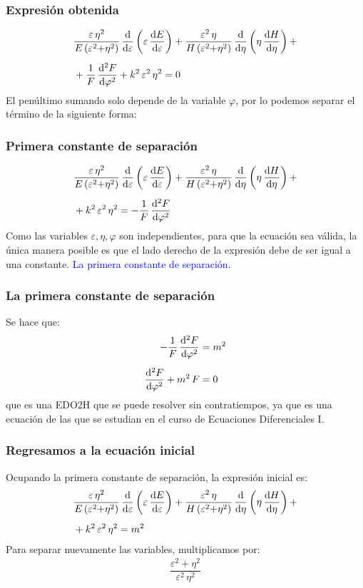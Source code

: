 \documentclass[12pt]{beamer}
\begin{document}
\begin{frame}
\frametitle{Expresión obtenida}
\pause
\begin{align*}
&\dfrac{\varepsilon \, \eta^{2}}{E \, (\varepsilon^{2} {+} \eta^{2})} \, \dv{\varepsilon} \left( \varepsilon \, \dv{E}{\varepsilon} \right) + 
\dfrac{\varepsilon^{2} \, \eta}{H \, (\varepsilon^{2} {+} \eta^{2})} \, \dv{\eta} \left( \eta \, \dv{H}{\eta} \right) + \\[0.5em]
&+ \dfrac{1}{F} \, \dv[2]{F}{\varphi} + k^{2} \, \varepsilon^{2} \, \eta^{2} = 0
\end{align*}
\pause
El penúltimo sumando solo depende de la variable $\varphi$, por lo podemos separar el término de la siguiente forma:
\end{frame}
\begin{frame}
\frametitle{Primera constante de separación}
\pause
\begin{align*}
&\dfrac{\varepsilon \, \eta^{2}}{E \, (\varepsilon^{2} {+} \eta^{2})} \, \dv{\varepsilon} \left( \varepsilon \, \dv{E}{\varepsilon} \right) + 
\dfrac{\varepsilon^{2} \, \eta}{H \, (\varepsilon^{2} {+} \eta^{2})} \, \dv{\eta} \left( \eta \, \dv{H}{\eta} \right) + \\[0.5em]
&+ k^{2} \, \varepsilon^{2} \, \eta^{2} = - \dfrac{1}{F} \, \dv[2]{F}{\varphi}
\end{align*}
\pause
Como las variables $\varepsilon, \eta, \varphi$ son independientes, \pause para que la ecuación sea válida, la única manera posible es que el lado derecho de la expresión debe de ser igual a una constante. \pause \textcolor{blue}{La primera constante de separación.}
\end{frame}
\begin{frame}
\frametitle{La primera constante de separación}
Se hace que:
\begin{align}
\begin{aligned}[b]
- \dfrac{1}{F} \, \dv[2]{F}{\varphi} &=  m^{2} \\[0.5em]
\dv[2]{F}{\varphi} + m^{2} \, F &= 0
\end{aligned}
\label{Eq:ecuacion_F}
\end{align}
que es una EDO2H que se puede resolver sin contratiempos, ya que es una ecuación de las que se estudian en el curso de Ecuaciones Diferenciales I.
\end{frame}
\begin{frame}
\frametitle{Regresamos a la ecuación inicial}
Ocupando la primera constante de separación, la expresión inicial es:
\pause
\begin{align*}
&\dfrac{\varepsilon \, \eta^{2}}{E \, (\varepsilon^{2} {+} \eta^{2})} \, \dv{\varepsilon} \left( \varepsilon \, \dv{E}{\varepsilon} \right) + 
\dfrac{\varepsilon^{2} \, \eta}{H \, (\varepsilon^{2} {+} \eta^{2})} \, \dv{\eta} \left( \eta \, \dv{H}{\eta} \right) + \\[0.5em]
&+ k^{2} \, \varepsilon^{2} \, \eta^{2} = m^{2}
\end{align*}
\pause
Para separar nuevamente las variables, multiplicamos por:
\begin{align*}
\dfrac{\varepsilon^{2} + \eta^{2}}{\varepsilon^{2} \, \eta^{2}}
\end{align*}
\end{frame}
\end{document}

